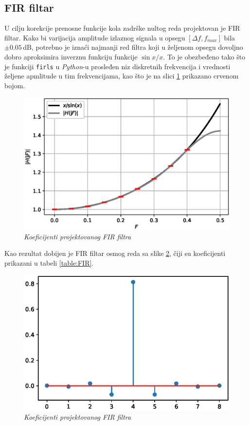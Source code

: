 \documentclass[conference]{IEEEtran}
\begin{document}
\subsection{FIR filtar}
U cilju korekcije prenosne funkcije kola zadrške nultog reda projektovan je FIR filtar. Kako bi varijacija amplitude izlaznog signala u opsegu $[\Delta f, f_{max}]$ bila $\pm 0.05$\,dB, potrebno je iznaći najmanji red filtra koji u željenom opsegu dovoljno dobro aproksimira inverznu funkciju funkcije $\sin x/x$. To je obezbeđeno tako što je funkciji \texttt{firls} u \textsl{Python}-u prosleđen niz diskretnih frekvencija i vrednosti željene apmlitude u tim frekvencijama, kao što je na slici \ref{slika:poredjenje} prikazano crvenom bojom.
\vfill
\begin{figure}[h]
	\centering
	\includegraphics[scale=0.45]{./slike/poredjenje.eps}
	\caption{\textsl{Koeficijenti projektovanog FIR filtra}}
	\label{slika:poredjenje}
\end{figure}
\vfill

Kao rezultat dobijen je FIR filtar osmog reda sa slike \ref{slika:FIR}, čiji su koeficijenti prikazani u tabeli \ref{table:FIR}. \newpage

\begin{figure}[h]
	\centering
	\includegraphics[scale=0.5]{./slike/FIR.eps}
	\caption{\textsl{Koeficijenti projektovanog FIR filtra}}
	\label{slika:FIR}
\end{figure}
\end{document}
